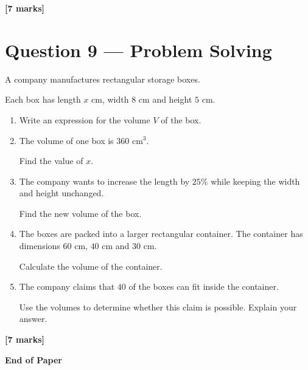 	\vfill
	
	\noindent
	\textbf{[7 marks]}
	
	\newpage
	
	
	\section*{Question 9 --- Problem Solving}
	
	A company manufactures rectangular storage boxes.
	
	Each box has length \(x\) cm, width \(8\) cm and height \(5\) cm.
	
	\begin{enumerate}
		\item[(a)] Write an expression for the volume \(V\) of the box.
		
		\vspace{12mm}
		
		\item[(b)] The volume of one box is \(360\text{ cm}^3\).
		
		Find the value of \(x\).
		
		\vspace{15mm}
		
		\item[(c)] The company wants to increase the length by \(25\%\)
		while keeping the width and height unchanged.
		
		Find the new volume of the box.
		
		\vspace{15mm}
		
		\item[(d)] The boxes are packed into a larger rectangular container.
		The container has dimensions \(60\text{ cm}\), \(40\text{ cm}\) and
		\(30\text{ cm}\).
		
		Calculate the volume of the container.
		
		\vspace{12mm}
		
		\item[(e)] The company claims that \(40\) of the boxes can fit inside
		the container.
		
		Use the volumes to determine whether this claim is possible.
		Explain your answer.
	\end{enumerate}
	
	\vfill
	
	\noindent
	\textbf{[7 marks]}
	
	\newpage
	
	
	\begin{center}
		\textbf{End of Paper}
	\end{center}
	
